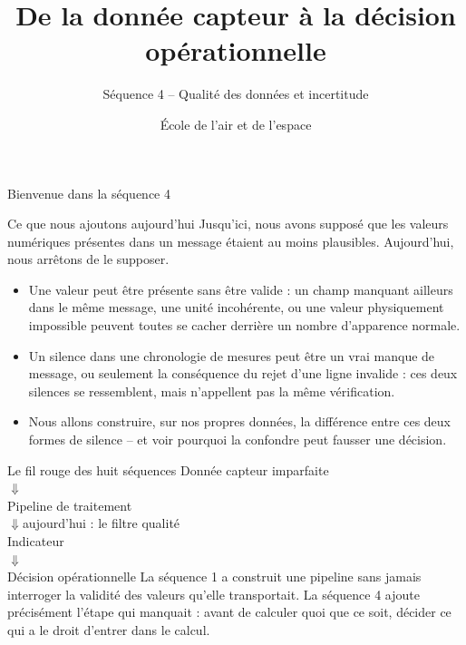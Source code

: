 \documentclass[aspectratio=169]{beamer}
\title{De la donnée capteur à la décision opérationnelle}
\subtitle{Séquence 4 -- Qualité des données et incertitude}
\author{École de l'air et de l'espace}
\date{}
\begin{document}
\begin{frame}
  \titlepage
\end{frame}

\begin{frame}{Bienvenue dans la séquence 4}
  \begin{block}{Ce que nous ajoutons aujourd'hui}
    Jusqu'ici, nous avons supposé que les valeurs numériques présentes dans un message étaient au moins plausibles. Aujourd'hui, nous arrêtons de le supposer.
  \end{block}
  \begin{itemize}
    \item Une valeur peut être présente sans être valide : un champ manquant ailleurs dans le même message, une unité incohérente, ou une valeur physiquement impossible peuvent toutes se cacher derrière un nombre d'apparence normale.
    \item Un silence dans une chronologie de mesures peut être un vrai manque de message, ou seulement la conséquence du rejet d'une ligne invalide : ces deux silences se ressemblent, mais n'appellent pas la même vérification.
    \item Nous allons construire, sur nos propres données, la différence entre ces deux formes de silence -- et voir pourquoi la confondre peut fausser une décision.
  \end{itemize}
\end{frame}

\begin{frame}{Le fil rouge des huit séquences}
  \centering
  \Large Donnée capteur imparfaite\\[2mm]
  $\Downarrow$\\[-1mm]
  Pipeline de traitement\\[-1mm]
  $\Downarrow$\quad \alert{\normalsize aujourd'hui : le filtre qualité}\\[-1mm]
  Indicateur\\[-1mm]
  $\Downarrow$\\[-1mm]
  Décision opérationnelle
  \vfill
  \normalsize La séquence 1 a construit une pipeline sans jamais interroger la validité des valeurs qu'elle transportait. La séquence 4 ajoute précisément l'étape qui manquait : avant de calculer quoi que ce soit, décider ce qui a le droit d'entrer dans le calcul.
\end{frame}
\end{document}
